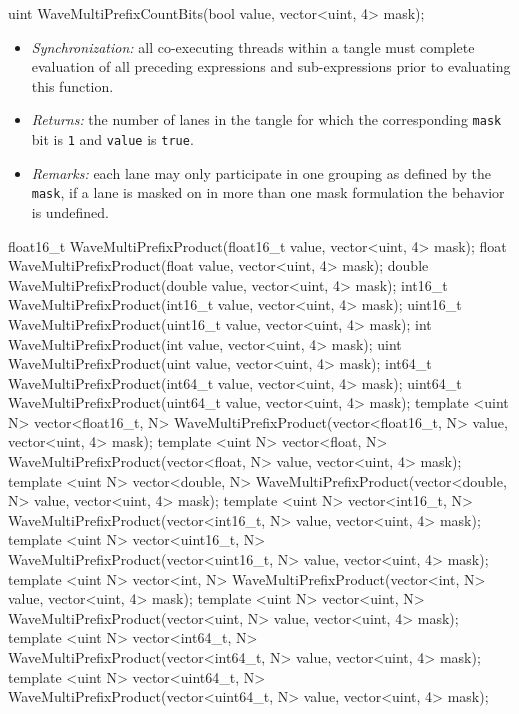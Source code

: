 \begin{HLSL}
uint WaveMultiPrefixCountBits(bool value, vector<uint, 4> mask);
\end{HLSL}

\begin{itemize}
  \item \textit{Synchronization:} all co-executing threads within a \gls{tangle}
  must complete evaluation of all preceding expressions and sub-expressions
  prior to evaluating this function.
  \item \textit{Returns:} the number of \gls{lane}s in the \gls{tangle} for
  which the corresponding \texttt{mask} bit is \texttt{1} and \texttt{value} is
  \texttt{true}.
  \item \textit{Remarks:} each \gls{lane} may only participate in one grouping
  as defined by the \texttt{mask}, if a \gls{lane} is masked on in more than one
  mask formulation the behavior is undefined.
\end{itemize}

\begin{HLSL}
float16_t WaveMultiPrefixProduct(float16_t value, vector<uint, 4> mask);
float WaveMultiPrefixProduct(float value, vector<uint, 4> mask);
double WaveMultiPrefixProduct(double value, vector<uint, 4> mask);
int16_t WaveMultiPrefixProduct(int16_t value, vector<uint, 4> mask);
uint16_t WaveMultiPrefixProduct(uint16_t value, vector<uint, 4> mask);
int WaveMultiPrefixProduct(int value, vector<uint, 4> mask);
uint WaveMultiPrefixProduct(uint value, vector<uint, 4> mask);
int64_t WaveMultiPrefixProduct(int64_t value, vector<uint, 4> mask);
uint64_t WaveMultiPrefixProduct(uint64_t value, vector<uint, 4> mask);
template <uint N>
vector<float16_t, N> WaveMultiPrefixProduct(vector<float16_t, N> value, vector<uint, 4> mask);
template <uint N>
vector<float, N> WaveMultiPrefixProduct(vector<float, N> value, vector<uint, 4> mask);
template <uint N>
vector<double, N> WaveMultiPrefixProduct(vector<double, N> value, vector<uint, 4> mask);
template <uint N>
vector<int16_t, N> WaveMultiPrefixProduct(vector<int16_t, N> value, vector<uint, 4> mask);
template <uint N>
vector<uint16_t, N> WaveMultiPrefixProduct(vector<uint16_t, N> value, vector<uint, 4> mask);
template <uint N>
vector<int, N> WaveMultiPrefixProduct(vector<int, N> value, vector<uint, 4> mask);
template <uint N>
vector<uint, N> WaveMultiPrefixProduct(vector<uint, N> value, vector<uint, 4> mask);
template <uint N>
vector<int64_t, N> WaveMultiPrefixProduct(vector<int64_t, N> value, vector<uint, 4> mask);
template <uint N>
vector<uint64_t, N> WaveMultiPrefixProduct(vector<uint64_t, N> value, vector<uint, 4> mask);
\end{HLSL}

